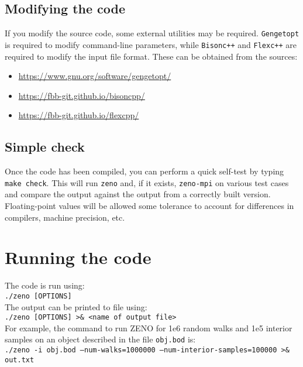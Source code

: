 \documentclass[12pt,letterpaper]{article}
\begin{document}
\subsection{Modifying the code}

\noindent If you modify the source code, some external utilities may be required.  \texttt{Gengetopt} is required to modify command-line parameters, while \texttt{Bisonc++} and \texttt{Flexc++} are required to modify the input file format.  These can be obtained from the sources:
\begin{itemize}
\item[] \url{https://www.gnu.org/software/gengetopt/}
\item[] \url{https://fbb-git.github.io/bisoncpp/}
\item[] \url{https://fbb-git.github.io/flexcpp/}
\end{itemize} 

\subsection{Simple check}

Once the code has been compiled, you can perform a quick self-test by typing \texttt{make check}.  This will run \texttt{zeno} and, if it exists, \texttt{zeno-mpi} on various test cases and compare the output against the output from a correctly built version.  Floating-point values will be allowed some tolerance to account for differences in compilers, machine precision, etc. 

\section{Running the code}
\label{sec:runcode}
The code is run using: \\

\texttt{./zeno [OPTIONS]} \\

\noindent The output can be printed to file using: \\

\texttt{./zeno [OPTIONS] >\& <name of output file>} \\

\noindent For example, the command to run ZENO for 1e6 random walks and 1e5 interior samples on an object described in the file \texttt{obj.bod} is: \\

\texttt{./zeno -i obj.bod --num-walks=1000000 --num-interior-samples=100000 >\& out.txt} \\
\end{document}
